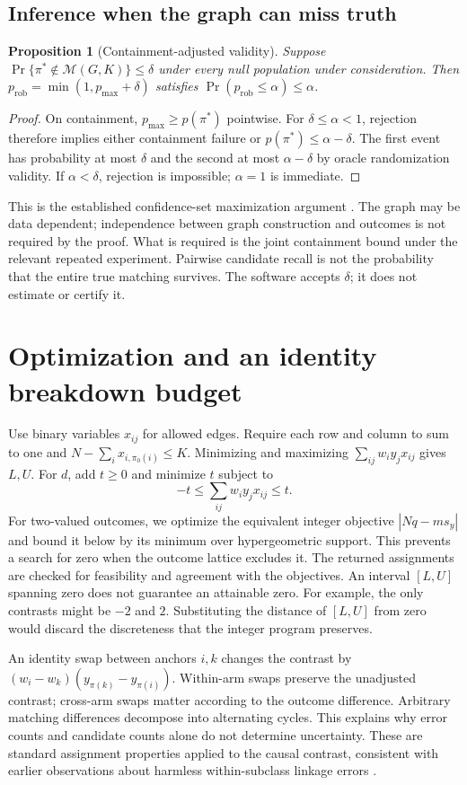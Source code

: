 \documentclass[11pt]{article}
\newtheorem{proposition}{Proposition}
\newcommand{\M}{\mathcal M}
\begin{document}
\subsection{Inference when the graph can miss truth}
\begin{proposition}[Containment-adjusted validity]
Suppose $\Pr\{\pi^*\notin\M(G,K)\}\le\delta$ under every null population under
consideration. Then $p_{\mathrm{rob}}=\min(1,p_{\max}+\delta)$ satisfies
$\Pr(p_{\mathrm{rob}}\le\alpha)\le\alpha$.
\end{proposition}
\begin{proof}
On containment, $p_{\max}\ge p(\pi^*)$ pointwise. For $\delta\le\alpha<1$, rejection
therefore implies either containment failure or $p(\pi^*)\le\alpha-\delta$.
The first event has probability at most $\delta$ and the second at most
$\alpha-\delta$ by oracle randomization validity. If $\alpha<\delta$, rejection
is impossible; $\alpha=1$ is immediate.
\end{proof}
This is the established confidence-set maximization argument \citep{berger}.
The graph may be data dependent; independence between graph construction and outcomes
is not required by the proof. What is required is the joint containment bound under
the relevant repeated experiment. Pairwise candidate recall is not the probability
that the entire true matching survives. The software accepts $\delta$; it does not
estimate or certify it.

\section{Optimization and an identity breakdown budget}
Use binary variables $x_{ij}$ for allowed edges. Require each row and column to sum to
one and $N-\sum_i x_{i,\pi_0(i)}\le K$. Minimizing and maximizing
$\sum_{ij}w_i y_j x_{ij}$ gives $L,U$. For $d$, add $t\ge0$ and minimize $t$ subject to
\[
 -t\le\sum_{ij}w_i y_jx_{ij}\le t.
\]
For two-valued outcomes, we optimize the equivalent integer objective
$|Nq-ms_y|$ and bound it below by its minimum over hypergeometric support. This
prevents a search for zero when the outcome lattice excludes it. The returned
assignments are checked for feasibility and agreement with the objectives.
An interval $[L,U]$ spanning zero does not guarantee an attainable zero. For example,
the only contrasts might be $-2$ and $2$. Substituting the distance of $[L,U]$ from
zero would discard the discreteness that the integer program preserves.

An identity swap between anchors $i,k$ changes the contrast by
$(w_i-w_k)(y_{\pi(k)}-y_{\pi(i)})$. Within-arm swaps preserve the unadjusted contrast;
cross-arm swaps matter according to the outcome difference. Arbitrary matching
differences decompose into alternating cycles. This explains why error counts and
candidate counts alone do not determine uncertainty. These are standard assignment
properties applied to the causal contrast, consistent with earlier observations about
harmless within-subclass linkage errors \citep{wortman}.
\end{document}
